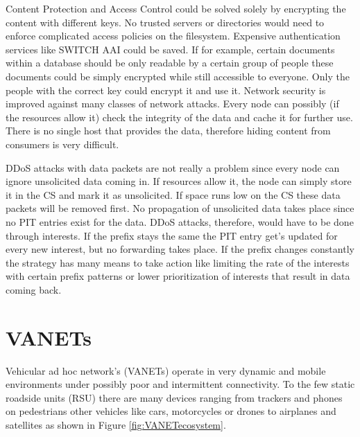 \vspace{5mm} %

Content Protection and Access Control could be solved solely by encrypting the content with different keys. No trusted servers or directories would need to enforce complicated access policies on the filesystem. Expensive authentication services like SWITCH AAI could be saved. If for example, certain documents within a database should be only readable by a certain group of people these documents could be simply encrypted while still accessible to everyone. Only the people with the correct key could encrypt it and use it.
Network security is improved against many classes of network attacks. Every node can possibly (if the resources allow it) check the integrity of the data and cache it for further use. There is no single host that provides the data, therefore hiding content from consumers is very difficult.

\vspace{5mm} %

DDoS attacks with data packets are not really a problem since every node can ignore unsolicited data coming in. If resources allow it, the node can simply store it in the CS and mark it as unsolicited. If space runs low on the CS these data packets will be removed first. No propagation of unsolicited data takes place since no PIT entries exist for the data. DDoS attacks, therefore, would have to be done through interests. If the prefix stays the same the PIT entry get's updated for every new interest, but no forwarding takes place. If the prefix changes constantly the strategy has many means to take action like limiting the rate of the interests with certain prefix patterns or lower prioritization of interests that result in data coming back. 

\newpage
\section{VANETs}

Vehicular ad hoc network's (VANETs) operate in very dynamic and mobile environments under possibly poor and intermittent connectivity. To the few static roadside units (RSU) there are many devices ranging from trackers and phones on pedestrians other vehicles like cars, motorcycles or drones to airplanes and satellites as shown in Figure \ref{fig:VANETecosystem}.

\vspace{5mm} %

